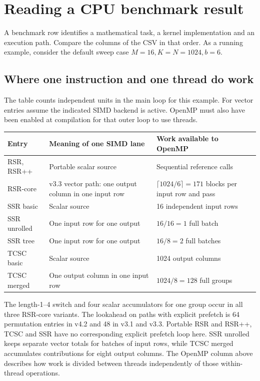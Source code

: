\documentclass[11pt,a4paper]{article}
\newcommand{\familymark}[1]{\markboth{#1}{}}
\begin{document}
\clearpage
\familymark{Benchmark interpretation}
\section{Reading a CPU benchmark result}\label{sec:timing}
A benchmark row identifies a mathematical task, a kernel implementation and an
execution path. Compare the columns of the CSV in that order. As a running
example, consider the default sweep case \(M=16,K=N=1024,b=6\).
\subsection{Where one instruction and one thread do work}
The table counts independent units in the main loop for this example.
For vector entries assume the indicated SIMD backend is active. OpenMP
must also have been enabled at compilation for that outer loop to use threads.
\begin{center}
\small
\begin{tabular}{@{}p{.22\linewidth}p{.34\linewidth}p{.36\linewidth}@{}}
\toprule
Entry & Meaning of one SIMD lane & Work available to OpenMP\\ \midrule
RSR, RSR++ & Portable scalar source & Sequential reference calls\\
RSR-core & v3.3 vector path: one output column in one input row &
\(\lceil1024/6\rceil=171\) blocks per input row and pass\\
SSR basic & Scalar source & 16 independent input rows\\
SSR unrolled & One input row for one output & \(16/16=1\) full batch\\
SSR tree & One input row for one output & \(16/8=2\) full batches\\
TCSC basic & Scalar source & 1024 output columns\\
TCSC merged & One output column in one input row &
\(1024/8=128\) full groups\\
\bottomrule
\end{tabular}
\end{center}
The length-1--4 switch and four scalar accumulators for one group occur
in all three RSR-core variants. The lookahead on paths with explicit
prefetch is 64 permutation entries in v4.2 and 48 in v3.1 and v3.3.
Portable RSR and RSR++, TCSC and SSR have no corresponding explicit
prefetch loop here. SSR unrolled keeps separate vector totals for batches
of input rows, while TCSC merged accumulates contributions for eight
output columns. The OpenMP column above describes how work is divided
between threads independently of those within-thread operations.
\end{document}
